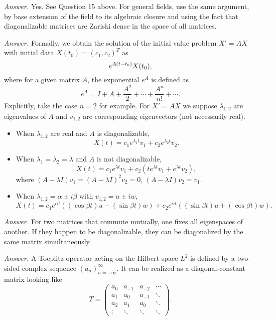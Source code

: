 \documentclass{mathproblems}
\begin{document}
\begin{questions}
\textit{Answer.} Yes. See Question 15 above. For general fields, use the same argument, by base extension of the field to its algebraic closure and using the fact that diagonalizable matrices are Zariski dense in the space of all matrices.        


\textit{Answer.} Formally, we obtain the solution of the initial value problem $X'=AX$ with initial data $X(t_0)=(c_1,c_2)^T$ as \vspace{-4pt}
$$
e^{A(t-t_0)} X(t_0), \vspace{-4pt}
$$
where for a given matrix $A$, the exponential $e^A$ is defined as \vspace{-4pt}
$$
e^A=I+A+\frac{A^2}{2}+\cdots +\frac{A^n}{n!}+\cdots. 
$$
Explicitly, take the case $n=2$ for example. For $X'=AX$ we suppose $\lambda_{1,2}$ are eigenvalues of $A$ and $v_{1,2}$ are corresponding eigenvectors (not necessarily real). \vspace{-6pt}
\begin{itemize}
\item When $\lambda_{1,2}$ are real and $A$ is diagonalizable, 
$$
X(t)=c_1e^{\lambda_1 t}v_1+c_2e^{\lambda_2 t}v_2.
$$
\item When $\lambda_{1}=\lambda_2=\lambda$ and $A$ is not diagonalizable, 
$$
X(t)=c_1e^{\lambda t}v_1+c_2(te^{\lambda t}v_1+e^{\lambda t}v_2),
$$
where $(A-\lambda I)v_1=(A-\lambda I)^2 v_2=0$, $(A-\lambda I)v_2=v_1$.
\item When $\lambda_{1,2}=\alpha\pm i\beta$ with $v_{1,2}=u\pm iw$,
$$
X(t)=c_{1} e^{\alpha t}((\cos \beta t) u-(\sin \beta t) w)+c_{2} e^{\alpha t}((\sin \beta t) u+(\cos \beta t) w).
$$
\end{itemize}



\textit{Answer.} For two matrices that commute mutually, one fixes all eigenspaces of another. If they happen to be diagonalizable, they can be diagonalized by the same matrix simultaneously.


\textit{Answer.} A Toeplitz operator acting on the Hilbert space $L^2$ is defined by a two-sided complex sequence $(a_n)_{n=-\infty}^\infty$. It can be realized as a diagonal-constant matrix looking like
$$
T=\begin{pmatrix}
a_{0} & a_{-1} & a_{-2} & \cdots \\
a_{1} & a_{0} & a_{-1} & \ddots \\
a_{2} & a_{1} & a_{0} & \ddots \\
\vdots & \ddots & \ddots & \ddots
\end{pmatrix}.
$$


\end{questions}
\end{document}
